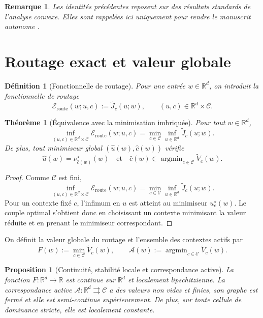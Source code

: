 \documentclass[11pt,a4paper]{article}
\newtheorem{definition}{Définition}[section]
\newtheorem{proposition}{Proposition}[section]
\newtheorem{theorem}{Théorème}[section]
\newtheorem{remark}{Remarque}[section]
\DeclareMathOperator{\argmin}{argmin}
\newcommand{\R}{\mathbb R}
\newcommand{\Ccal}{\mathcal C}
\begin{document}
\begin{remark}
Les identités précédentes reposent sur des résultats standards de l'analyse convexe. Elles sont rappelées ici uniquement pour rendre le manuscrit autonome \cite{Moreau1965,Rockafellar1970,BauschkeCombettes2017,RockafellarWets1998}.
\end{remark}

\section{Routage exact et valeur globale}

\begin{definition}[Fonctionnelle de routage]
Pour une entrée \(w\in\R^d\), on introduit la fonctionnelle de routage
\[
\mathcal E_{\mathrm{route}}(w;u,c):=\widetilde J_c(u;w),
\qquad
(u,c)\in \R^d\times\Ccal.
\]
\end{definition}

\begin{theorem}[Équivalence avec la minimisation imbriquée]
Pour tout \(w\in\R^d\),
\[
\inf_{(u,c)\in \R^d\times\Ccal}\mathcal E_{\mathrm{route}}(w;u,c)
=
\min_{c\in\Ccal}\inf_{u\in\R^d}\widetilde J_c(u;w).
\]
De plus, tout minimiseur global \((\hat u(w),\hat c(w))\) vérifie
\[
\hat u(w)=\nu_{\hat c(w)}^\star(w)
\quad\text{et}\quad
\hat c(w)\in\argmin_{c\in\Ccal}\widetilde V_c(w).
\]
\end{theorem}

\begin{proof}
Comme \(\Ccal\) est fini,
\[
\inf_{(u,c)\in \R^d\times\Ccal}\mathcal E_{\mathrm{route}}(w;u,c)
=
\min_{c\in\Ccal}\inf_{u\in\R^d}\widetilde J_c(u;w).
\]
Pour un contexte fixé \(c\), l'infimum en \(u\) est atteint au minimiseur \(u_c^\star(w)\). Le couple optimal s'obtient donc en choisissant un contexte minimisant la valeur réduite et en prenant le minimiseur correspondant.
\end{proof}

On définit la valeur globale du routage et l'ensemble des contextes actifs par
\[
F(w):=\min_{c\in\Ccal}\widetilde V_c(w),
\qquad
\mathcal A(w):=\argmin_{c\in\Ccal}\widetilde V_c(w).
\]

\begin{proposition}[Continuité, stabilité locale et correspondance active]
La fonction \(F:\R^d\to\R\) est continue sur \(\R^d\) et localement lipschitzienne. La correspondance active \(\mathcal A:\R^d\rightrightarrows\Ccal\) a des valeurs non vides et finies, son graphe est fermé et elle est semi-continue supérieurement. De plus, sur toute cellule de dominance stricte, elle est localement constante.
\end{proposition}
\end{document}
